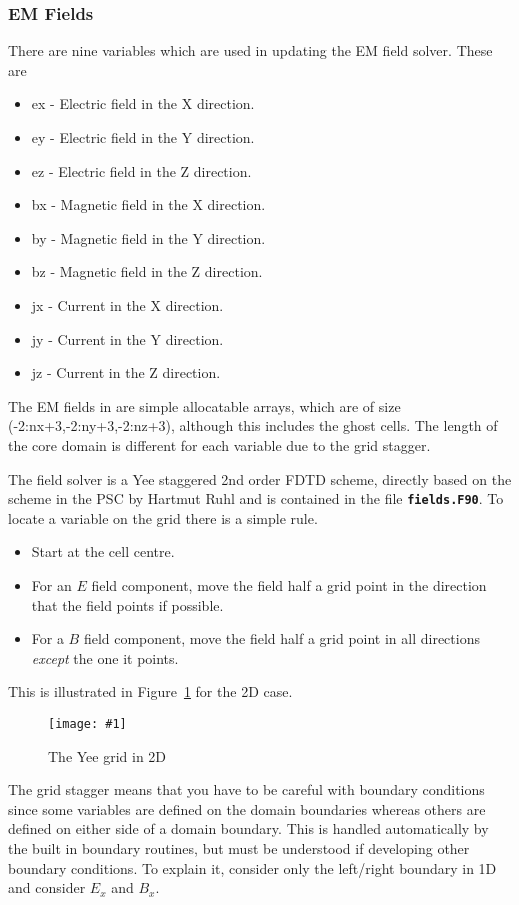 \documentclass[12pt,a4paper]{article}
\newcommand{\inlinecode}[1]{{\color{warwickred} \bf\texttt{#1}}}
\newcommand{\EPOCH}{{\color{warwickdark}\fontfamily{phv}\selectfont{EPOCH}}}
\newcommand{\captionedimage}[3]
  {{\begin{figure}[hbt!]\centering\texttt{[image: \#1]}\caption{#3}\label{#2}
    \end{figure}}}
\begin{document}
\subsubsection{EM Fields}
There are nine variables which are used in updating the EM field solver. These
are
\begin{itemize}
\item ex - Electric field in the X direction.
\item ey - Electric field in the Y direction.
\item ez - Electric field in the Z direction.
\item bx - Magnetic field in the X direction.
\item by - Magnetic field in the Y direction.
\item bz - Magnetic field in the Z direction.
\item jx - Current in the X direction.
\item jy - Current in the Y direction.
\item jz - Current in the Z direction.
\end{itemize}
The EM fields in {\EPOCH} are simple allocatable arrays, which are of size
(-2:nx+3,-2:ny+3,-2:nz+3), although this includes the ghost cells. The length of
the core domain is different for each variable due to the grid stagger.

The {\EPOCH} field solver is a Yee staggered 2nd order FDTD scheme, directly
based on the scheme in the PSC by Hartmut Ruhl and is contained in the file
\inlinecode{fields.F90}. To locate a variable on the grid there is a simple
rule.
\begin{itemize}
\item Start at the cell centre.
\item For an $E$ field component, move the field half a grid point in the
  direction that the field points if possible.
\item For a $B$ field component, move the field half a grid point in all
  directions {\it except} the one it points.
\end{itemize}
This is illustrated in Figure~\ref{yeegrid} for the 2D case.\\

\captionedimage{./images/stagger}{yeegrid}{The Yee grid in 2D}


The grid stagger means that you have to be careful with boundary conditions
since some variables are defined on the domain boundaries whereas others are
defined on either side of a domain boundary. This is handled automatically by
the built in boundary routines, but must be understood if developing other
boundary conditions. To explain it, consider only the left/right boundary in 1D
and consider $E_x$ and $B_x$.\\
\end{document}
